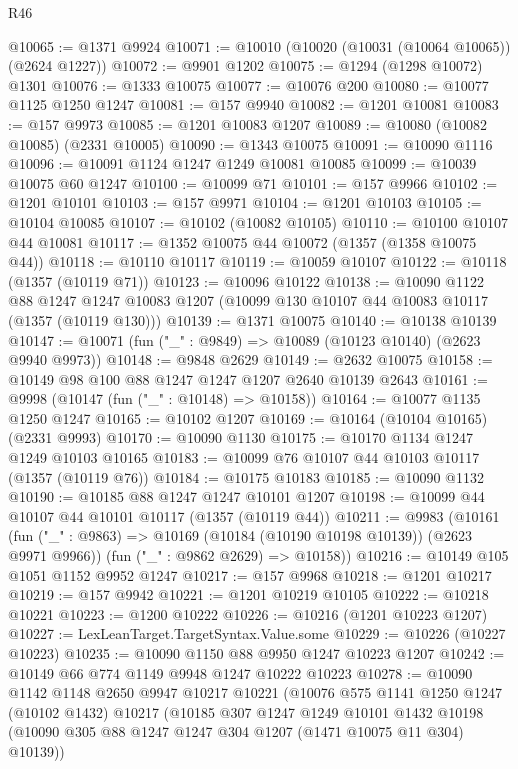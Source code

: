 \begin{lexlean}{R46}
\begin{coremodule}
@10065 := @1371 @9924
@10071 := @10010 (@10020 (@10031 (@10064 @10065)) (@2624 @1227))
@10072 := @9901 @1202
@10075 := @1294 (@1298 @10072) @1301
@10076 := @1333 @10075
@10077 := @10076 @200
@10080 := @10077 @1125 @1250 @1247
@10081 := @157 @9940
@10082 := @1201 @10081
@10083 := @157 @9973
@10085 := @1201 @10083 @1207
@10089 := @10080 (@10082 @10085) (@2331 @10005)
@10090 := @1343 @10075
@10091 := @10090 @1116
@10096 := @10091 @1124 @1247 @1249 @10081 @10085
@10099 := @10039 @10075 @60 @1247
@10100 := @10099 @71
@10101 := @157 @9966
@10102 := @1201 @10101
@10103 := @157 @9971
@10104 := @1201 @10103
@10105 := @10104 @10085
@10107 := @10102 (@10082 @10105)
@10110 := @10100 @10107 @44 @10081
@10117 := @1352 @10075 @44 @10072 (@1357 (@1358 @10075 @44))
@10118 := @10110 @10117
@10119 := @10059 @10107
@10122 := @10118 (@1357 (@10119 @71))
@10123 := @10096 @10122
@10138 := @10090
    @1122
    @88
    @1247
    @1247
    @10083
    @1207
    (@10099 @130 @10107 @44 @10083 @10117 (@1357 (@10119 @130)))
@10139 := @1371 @10075
@10140 := @10138 @10139
@10147 := @10071 (fun ("_" : @9849) => @10089 (@10123 @10140) (@2623 @9940 @9973))
@10148 := @9848 @2629
@10149 := @2632 @10075
@10158 := @10149 @98 @100 @88 @1247 @1247 @1207 @2640 @10139 @2643
@10161 := @9998 (@10147 (fun ("_" : @10148) => @10158))
@10164 := @10077 @1135 @1250 @1247
@10165 := @10102 @1207
@10169 := @10164 (@10104 @10165) (@2331 @9993)
@10170 := @10090 @1130
@10175 := @10170 @1134 @1247 @1249 @10103 @10165
@10183 := @10099 @76 @10107 @44 @10103 @10117 (@1357 (@10119 @76))
@10184 := @10175 @10183
@10185 := @10090 @1132
@10190 := @10185 @88 @1247 @1247 @10101 @1207
@10198 := @10099 @44 @10107 @44 @10101 @10117 (@1357 (@10119 @44))
@10211 := @9983
    (@10161
      (fun ("_" : @9863) => @10169 (@10184 (@10190 @10198 @10139)) (@2623 @9971 @9966))
      (fun ("_" : @9862 @2629) => @10158))
@10216 := @10149 @105 @1051 @1152 @9952 @1247
@10217 := @157 @9968
@10218 := @1201 @10217
@10219 := @157 @9942
@10221 := @1201 @10219 @10105
@10222 := @10218 @10221
@10223 := @1200 @10222
@10226 := @10216 (@1201 @10223 @1207)
@10227 := LexLeanTarget.TargetSyntax.Value.some
@10229 := @10226 (@10227 @10223)
@10235 := @10090 @1150 @88 @9950 @1247 @10223 @1207
@10242 := @10149 @66 @774 @1149 @9948 @1247 @10222 @10223
@10278 := @10090
    @1142
    @1148
    @2650
    @9947
    @10217
    @10221
    (@10076
      @575
      @1141
      @1250
      @1247
      (@10102 @1432)
      @10217
      (@10185
        @307
        @1247
        @1249
        @10101
        @1432
        @10198
        (@10090 @305 @88 @1247 @1247 @304 @1207 (@1471 @10075 @11 @304) @10139))

\end{coremodule}
\end{lexlean}
